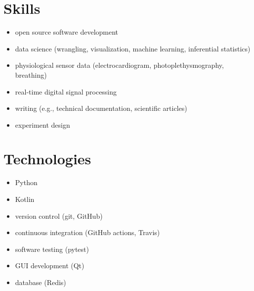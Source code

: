 \documentclass[a4paper, 10pt]{article}
\newcommand{\NewSection}[1]{\section*{\Large #1 \hrulefill}}
\begin{document}
\NewSection{Skills}
\begin{itemize}[leftmargin=*]    %
    \item open source software development
    \item data science (wrangling, visualization, machine learning, inferential statistics)
    \item physiological sensor data (electrocardiogram, photoplethysmography, breathing)
    \item real-time digital signal processing
    \item writing (e.g., technical documentation, scientific articles)
    \item experiment design
\end{itemize}


\NewSection{Technologies}
\begin{itemize}[leftmargin=*]
    \item Python
    \item Kotlin
    \item version control (git, GitHub)
    \item continuous integration (GitHub actions, Travis)
    \item software testing (pytest)
    \item GUI development (Qt)
    \item database (Redis)
\end{itemize}
\end{document}
